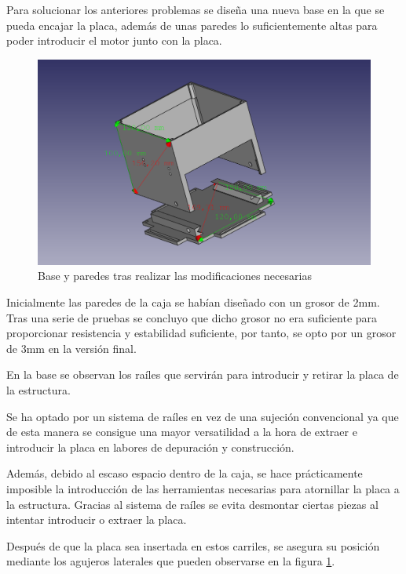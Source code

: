 Para solucionar los anteriores problemas se diseña una nueva base en la que se pueda encajar la placa, además de unas paredes lo suficientemente altas para poder introducir el motor junto con la placa.

 \begin{figure}[H]
    \centering
    \includegraphics[width=.9\linewidth]{pictures/paredesybasenuevas.png}
    \caption{Base y paredes tras realizar las modificaciones necesarias}
    \label{fig:placa_y_paredes_nuevas}
\end{figure}

Inicialmente las paredes de la caja se habían diseñado con un grosor de 2mm. Tras una serie de pruebas se concluyo que dicho grosor no era suficiente para proporcionar resistencia y estabilidad suficiente, por tanto, se opto por un grosor de 3mm en la versión final.

En la base se observan los raíles que servirán para introducir y retirar la placa de la estructura. 

Se ha optado por un sistema de raíles en vez de una sujeción convencional ya que de esta manera se consigue una mayor versatilidad a la hora de extraer e introducir la placa en labores de depuración y construcción. 

Además, debido al escaso espacio dentro de la caja, se hace prácticamente imposible la introducción de las herramientas necesarias para atornillar la placa a la estructura. Gracias al sistema de raíles se evita desmontar ciertas piezas al intentar introducir o extraer la placa.

Después de que la placa sea insertada en estos carriles, se asegura su posición mediante los agujeros laterales que pueden observarse en la figura \ref{fig:placa_y_paredes_nuevas}.

